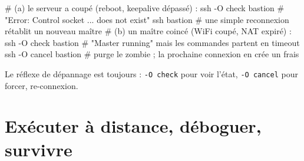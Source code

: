 \documentclass[a4paper,10pt]{exam}
\begin{document}
\begin{questions}
\begin{solution}
\begin{bashcode}
# (a) le serveur a coupé (reboot, keepalive dépassé) :
ssh -O check bastion     # "Error: Control socket ... does not exist"
ssh bastion              # une simple reconnexion rétablit un nouveau maître
# (b) un maître coincé (WiFi coupé, NAT expiré) :
ssh -O check bastion     # "Master running" mais les commandes partent en timeout
ssh -O cancel bastion    # purge le zombie ; la prochaine connexion en crée un frais
\end{bashcode}
Le réflexe de dépannage est toujours : \texttt{-O check} pour voir l'état,
\texttt{-O cancel} pour forcer, re-connexion.
\end{solution}
\end{questions}

\section{Exécuter à distance, déboguer, survivre}
\end{document}
